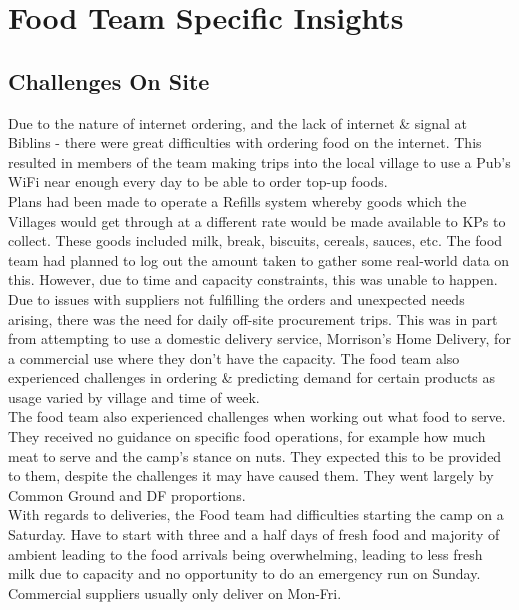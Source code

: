 \section{Food Team Specific Insights}
\subsection{Challenges On Site}
Due to the nature of internet ordering, and the lack of internet \& signal at Biblins - there were great difficulties with ordering food on the internet. This resulted in members of the team making trips into the local village to use a Pub's WiFi near enough every day to be able to order top-up foods. \\

Plans had been made to operate a Refills system whereby goods which the Villages would get through at a different rate would be made available to KPs to collect. These goods included milk, break, biscuits, cereals, sauces, etc. The food team had planned to log out the amount taken to gather some real-world data on this. However, due to time and capacity constraints, this was unable to happen.\\

Due to issues with suppliers not fulfilling the orders and unexpected needs arising, there was the need for daily off-site procurement trips. This was in part from attempting to use a domestic delivery service, Morrison's Home Delivery, for a commercial use where they don't have the capacity. The food team also experienced challenges in ordering \& predicting demand for certain products as usage varied by village and time of week.\\

The food team also experienced challenges when working out what food to serve. They received no guidance on specific food operations, for example how much meat to serve and the camp's stance on nuts. They expected this to be provided to them, despite the challenges it may have caused them. They went largely by Common Ground and DF proportions.\\

With regards to deliveries, the Food team had difficulties starting the camp on a Saturday. Have to start with three and a half days of fresh food and majority of ambient leading to the food arrivals being overwhelming, leading to less fresh milk due to capacity and no opportunity to do an emergency run on Sunday. Commercial suppliers usually only deliver on Mon-Fri.

